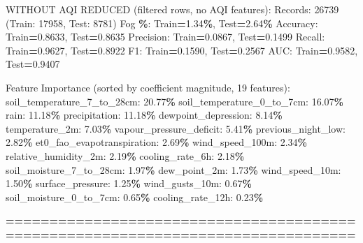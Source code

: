 \documentclass[
  letterpaper,
  DIV=11,
  numbers=noendperiod]{scrartcl}
\newenvironment{Shaded}{\begin{snugshade}}{\end{snugshade}}
\newcommand{\BuiltInTok}[1]{#1}
\newcommand{\DecValTok}[1]{\textcolor[rgb]{0.00,0.00,0.81}{#1}}
\newcommand{\FloatTok}[1]{\textcolor[rgb]{0.00,0.00,0.81}{#1}}
\newcommand{\NormalTok}[1]{#1}
\newcommand{\OperatorTok}[1]{\textcolor[rgb]{0.81,0.36,0.00}{\textbf{#1}}}
\begin{document}
\begin{Shaded}
\begin{Highlighting}[]
\NormalTok{WITHOUT AQI REDUCED (filtered rows, no AQI features):}
\NormalTok{  Records: }\DecValTok{26739}\NormalTok{ (Train: }\DecValTok{17958}\NormalTok{, Test: }\DecValTok{8781}\NormalTok{)}
\NormalTok{  Fog }\OperatorTok{\%}\NormalTok{: Train}\OperatorTok{=}\FloatTok{1.34}\OperatorTok{\%}\NormalTok{, Test}\OperatorTok{=}\FloatTok{2.64}\OperatorTok{\%}
\NormalTok{  Accuracy: Train}\OperatorTok{=}\FloatTok{0.8633}\NormalTok{, Test}\OperatorTok{=}\FloatTok{0.8635}
\NormalTok{  Precision: Train}\OperatorTok{=}\FloatTok{0.0867}\NormalTok{, Test}\OperatorTok{=}\FloatTok{0.1499}
\NormalTok{  Recall: Train}\OperatorTok{=}\FloatTok{0.9627}\NormalTok{, Test}\OperatorTok{=}\FloatTok{0.8922}
\NormalTok{  F1: Train}\OperatorTok{=}\FloatTok{0.1590}\NormalTok{, Test}\OperatorTok{=}\FloatTok{0.2567}
\NormalTok{  AUC: Train}\OperatorTok{=}\FloatTok{0.9582}\NormalTok{, Test}\OperatorTok{=}\FloatTok{0.9407}

\NormalTok{  Feature Importance (}\BuiltInTok{sorted}\NormalTok{ by coefficient magnitude, }\DecValTok{19}\NormalTok{ features):}
\NormalTok{    soil\_temperature\_7\_to\_28cm: }\FloatTok{20.77}\OperatorTok{\%}
\NormalTok{    soil\_temperature\_0\_to\_7cm: }\FloatTok{16.07}\OperatorTok{\%}
\NormalTok{    rain: }\FloatTok{11.18}\OperatorTok{\%}
\NormalTok{    precipitation: }\FloatTok{11.18}\OperatorTok{\%}
\NormalTok{    dewpoint\_depression: }\FloatTok{8.14}\OperatorTok{\%}
\NormalTok{    temperature\_2m: }\FloatTok{7.03}\OperatorTok{\%}
\NormalTok{    vapour\_pressure\_deficit: }\FloatTok{5.41}\OperatorTok{\%}
\NormalTok{    previous\_night\_low: }\FloatTok{2.82}\OperatorTok{\%}
\NormalTok{    et0\_fao\_evapotranspiration: }\FloatTok{2.69}\OperatorTok{\%}
\NormalTok{    wind\_speed\_100m: }\FloatTok{2.34}\OperatorTok{\%}
\NormalTok{    relative\_humidity\_2m: }\FloatTok{2.19}\OperatorTok{\%}
\NormalTok{    cooling\_rate\_6h: }\FloatTok{2.18}\OperatorTok{\%}
\NormalTok{    soil\_moisture\_7\_to\_28cm: }\FloatTok{1.97}\OperatorTok{\%}
\NormalTok{    dew\_point\_2m: }\FloatTok{1.73}\OperatorTok{\%}
\NormalTok{    wind\_speed\_10m: }\FloatTok{1.50}\OperatorTok{\%}
\NormalTok{    surface\_pressure: }\FloatTok{1.25}\OperatorTok{\%}
\NormalTok{    wind\_gusts\_10m: }\FloatTok{0.67}\OperatorTok{\%}
\NormalTok{    soil\_moisture\_0\_to\_7cm: }\FloatTok{0.65}\OperatorTok{\%}
\NormalTok{    cooling\_rate\_12h: }\FloatTok{0.23}\OperatorTok{\%}

\OperatorTok{================================================================================}


\end{Highlighting}
\end{Shaded}
\end{document}
